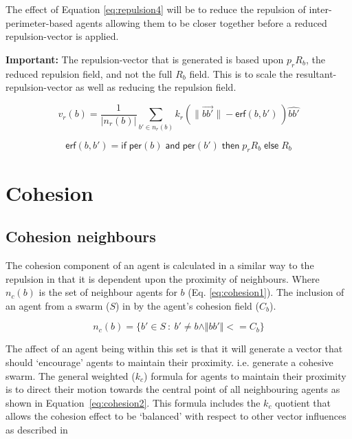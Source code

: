 \documentclass[12pt,a4paper]{article}
\newcommand{\important}[1]{\begin{importantBox} \textbf{Important:} #1 \end{importantBox}}
\newcommand{\magn}[1]{\Vert{#1}\Vert}
\begin{document}
The effect of Equation \ref{eq:repulsion4} will be to reduce the repulsion of inter-perimeter-based agents allowing them to be closer together before a reduced repulsion-vector is applied. 

\important{The repulsion-vector that is generated is based upon $p_rR_b$, the reduced repulsion field, and not the full $R_b$ field. This is to scale the resultant-repulsion-vector as well as reducing the repulsion field.}

\begin{equation}\label{eq:repulsion4}
v_r(b) = \frac{1}{\lvert n_r(b)\rvert}\sum_{b' \in n_r(b)} k_r\left(\lVert\vec{b b'}\rVert - \mathsf{erf}(b,b') \, \right)\widehat{bb'}
\end{equation}

\begin{equation}\label{eq:repulsion5}
\mathsf{erf}(b, b') = \mathsf{if} \;
\mathsf{per}(b) \; \mathsf{and} \; \mathsf{per}(b') \; \mathsf{then} \;
p_rR_b \; \mathsf{else} \; R_b
\end{equation}

\section{Cohesion}\label{cohesion}
\subsection{Cohesion neighbours}\label{cohesion:neighbours}
The cohesion component of an agent is calculated in a similar way to the repulsion in that it is dependent upon the proximity of neighbours. Where $n_c(b)$ is the set of neighbour agents for $b$ (Eq. \ref{eq:cohesion1}). The inclusion of an agent from a swarm ($S$) in by the agent's cohesion field ($C_b$).

\begin{equation}\label{eq:cohesion1}
n_c(b) = \{b' \in S~:~b' \neq b \land\magn{bb'} <= C_b\}
\end{equation}

The affect of an agent being within this set is that it will generate a vector that should `encourage' agents to maintain their proximity. i.e. generate a cohesive swarm. The general weighted ($k_c$) formula for agents to maintain their proximity is to direct their motion towards the central point of all neighbouring agents as shown in Equation~\ref{eq:cohesion2}. This formula includes the $k_c$ quotient that allows the cohesion effect to be `balanced' with respect to other vector influences as described in ~\cite{eliot2017methods,eliot2018metric,eliot2019void} 
\end{document}
